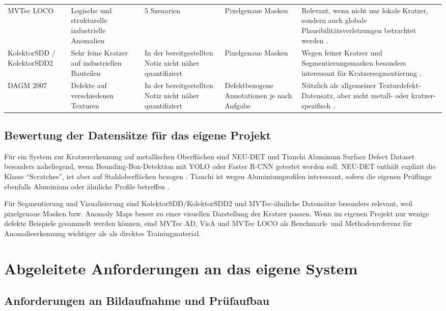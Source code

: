 \documentclass[11pt,a4paper]{article}
\begin{document}
\begin{longtable}{p{}p{}p{}p{}p{}}
MVTec LOCO & Logische und strukturelle industrielle Anomalien & 5 Szenarien & Pixelgenaue Masken & Relevant, wenn nicht nur lokale Kratzer, sondern auch globale Plausibilitätsverletzungen betrachtet werden \cite{efficientad}.\\
KolektorSDD / KolektorSDD2 & Sehr feine Kratzer auf industriellen Bauteilen & In der bereitgestellten Notiz nicht näher quantifiziert & Pixelgenaue Masken & Wegen feiner Kratzer und Segmentierungsmasken besonders interessant für Kratzersegmentierung \cite{ersteinfos}.\\
DAGM 2007 & Defekte auf verschiedenen Texturen & In der bereitgestellten Notiz nicht näher quantifiziert & Defektbezogene Annotationen je nach Aufgabe & Nützlich als allgemeiner Texturdefekt-Datensatz, aber nicht metall- oder kratzer-spezifisch \cite{ersteinfos}.\\
\bottomrule
\end{longtable}

\subsection{Bewertung der Datensätze für das eigene Projekt}

Für ein System zur Kratzererkennung auf metallischen Oberflächen sind NEU-DET und Tianchi Aluminum Surface Defect Dataset besonders naheliegend, wenn Bounding-Box-Detektion mit YOLO oder Faster R-CNN getestet werden soll. NEU-DET enthält explizit die Klasse \enquote{Scratches}, ist aber auf Stahloberflächen bezogen \cite{ersteinfos,applications_review}. Tianchi ist wegen Aluminiumprofilen interessant, sofern die eigenen Prüflinge ebenfalls Aluminium oder ähnliche Profile betreffen \cite{applications_review}. 

Für Segmentierung und Visualisierung sind KolektorSDD/KolektorSDD2 und MVTec-ähnliche Datensätze besonders relevant, weil pixelgenaue Masken bzw. Anomaly Maps besser zu einer visuellen Darstellung der Kratzer passen. Wenn im eigenen Projekt nur wenige defekte Beispiele gesammelt werden können, sind MVTec AD, VisA und MVTec LOCO als Benchmark- und Methodenreferenz für Anomalieerkennung wichtiger als als direktes Trainingmaterial.

\section{Abgeleitete Anforderungen an das eigene System}

\subsection{Anforderungen an Bildaufnahme und Prüfaufbau}
\end{document}
